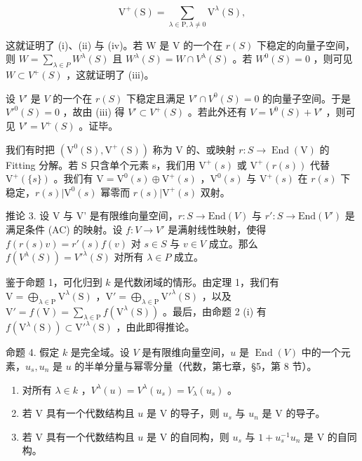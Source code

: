 \[
\mathrm{V} ^ {+} (\mathrm{S}) = \sum_ {\lambda \in \mathrm{P}, \lambda \neq 0} \mathrm{V} ^ {\lambda} (\mathrm{S}),\tag{3}
\]

这就证明了 (i)、(ii) 与 (iv)。若 W 是 V 的一个在 \(r(S)\) 下稳定的向量子空间，则 \(W = \sum_{\lambda \in P} W^{\lambda}(S)\) 且 \(W^{\lambda}(S) = W \cap V^{\lambda}(S)\) 。若 \(W^{0}(S) = 0\) ，则可见 \(W \subset V^{+}(S)\) ，这就证明了 (iii)。

设 \(V'\) 是 \(V\) 的一个在 \(r(S)\) 下稳定且满足 \(V' \cap V^0(S) = 0\) 的向量子空间。于是 \(V'^0(S) = 0\) ，故由 (iii) 得 \(V' \subset V^+(S)\) 。若此外还有 \(V = V^0(S) + V'\) ，则可见 \(V' = V^+(S)\) 。证毕。

我们有时把 \((\mathrm{V}^{0}(\mathrm{S}),\mathrm{V}^{+}(\mathrm{S}))\) 称为 V 的、或映射 \(r:S\to\operatorname{End}(\mathrm{V})\) 的 Fitting 分解。若 S 只含单个元素 s，我们用 \(\mathrm{V}^{+}(s)\) 或 \(\mathrm{V}^{+}(r(s))\) 代替 \(\mathrm{V}^{+}(\{s\})\) 。我们有 \(\mathrm{V}=\mathrm{V}^{0}(s)\oplus\mathrm{V}^{+}(s)\) ，\(\mathrm{V}^{0}(s)\) 与 \(\mathrm{V}^{+}(s)\) 在 \(r(s)\) 下稳定，\(r(s)|\mathrm{V}^{0}(s)\) 幂零而 \(r(s)|\mathrm{V}^{+}(s)\) 双射。

推论 3. 设 V 与 V' 是有限维向量空间，\(r: S \to \text{End}(V)\) 与 \(r': S \to \text{End}(V')\) 是满足条件 (AC) 的映射。设 \(f: V \to V'\) 是满射线性映射，使得 \(f(r(s)v) = r'(s)f(v)\) 对 \(s \in S\) 与 \(v \in V\) 成立。那么 \(f(V^{\lambda}(S)) = V'^{\lambda}(S)\) 对所有 \(\lambda \in P\) 成立。

鉴于命题 1，可化归到 \(k\) 是代数闭域的情形。由定理 1，我们有 \(\mathrm{V} = \bigoplus_{\lambda \in \mathrm{P}} \mathrm{V}^{\lambda}(\mathrm{S})\) ，\(\mathrm{V}' = \bigoplus_{\lambda \in \mathrm{P}} \mathrm{V}'^{\lambda}(\mathrm{S})\) ，以及 \(\mathrm{V}' = f(\mathrm{V}) = \sum_{\lambda \in \mathrm{P}} f(\mathrm{V}^{\lambda}(\mathrm{S}))\) 。最后，由命题 2 (i) 有 \(f(\mathrm{V}^{\lambda}(\mathrm{S})) \subset \mathrm{V}'^{\lambda}(\mathrm{S})\) ，由此即得推论。

命题 4. 假定 \(k\) 是完全域。设 \(V\) 是有限维向量空间，\(u\) 是 \(\operatorname{End}(V)\) 中的一个元素，\(u_s, u_n\) 是 \(u\) 的半单分量与幂零分量（代数，第七章，§5，第 8 节）。

\begin{enumerate}
\def\labelenumi{(\roman{enumi})}
\item
  对所有 \(\lambda \in k\) ，\(V^{\lambda}(u) = V^{\lambda}(u_s) = V_{\lambda}(u_s)\) 。
\item
  若 \(\mathrm{V}\) 具有一个代数结构且 \(u\) 是 \(\mathrm{V}\) 的导子，则 \(u_{s}\) 与 \(u_{n}\) 是 \(\mathrm{V}\) 的导子。
\item
  若 \(\mathrm{V}\) 具有一个代数结构且 \(u\) 是 \(\mathrm{V}\) 的自同构，则 \(u_{s}\) 与 \(1 + u_{s}^{-1}u_{n}\) 是 \(\mathrm{V}\) 的自同构。
\end{enumerate}


